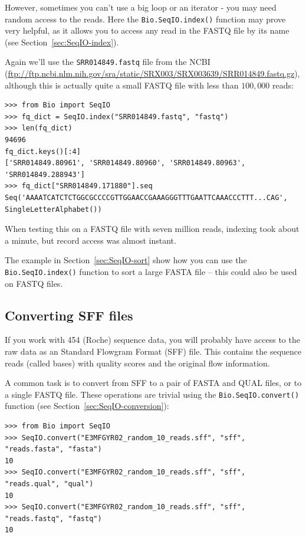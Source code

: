 \documentclass{report}
\begin{document}
However, sometimes you can't use a big loop or an iterator - you may need
random access to the reads. Here the \verb|Bio.SeqIO.index()| function
may prove very helpful, as it allows you to access any read in the FASTQ file
by its name (see Section~\ref{sec:SeqIO-index}).

Again we'll use the \texttt{SRR014849.fastq} file from the NCBI
(\url{ftp://ftp.ncbi.nlm.nih.gov/sra/static/SRX003/SRX003639/SRR014849.fastq.gz}),
although this is actually quite a small FASTQ file with less than $100,000$ reads:

\begin{verbatim}
>>> from Bio import SeqIO
>>> fq_dict = SeqIO.index("SRR014849.fastq", "fastq")
>>> len(fq_dict)
94696
fq_dict.keys()[:4]
['SRR014849.80961', 'SRR014849.80960', 'SRR014849.80963', 'SRR014849.288943']
>>> fq_dict["SRR014849.171880"].seq
Seq('AAAATCATCTCTGGCGCCCCGTTGGAACCGAAAGGGTTTGAATTCAAACCCTTT...CAG', SingleLetterAlphabet())
\end{verbatim}

When testing this on a FASTQ file with seven million reads,
indexing took about a minute, but record access was almost instant.

The example in Section~\ref{sec:SeqIO-sort} show how you can use the
\verb|Bio.SeqIO.index()| function to sort a large FASTA file -- this
could also be used on FASTQ files.

\subsection{Converting SFF files}
\label{sec:SeqIO-sff-conversion}

If you work with 454 (Roche) sequence data, you will probably have access
to the raw data as an Standard Flowgram Format (SFF) file. This contains
the sequence reads (called bases) with quality scores and the original
flow information.

A common task is to convert from SFF to a pair of FASTA and QUAL files,
or to a single FASTQ file. These operations are trivial using the
\verb|Bio.SeqIO.convert()| function (see Section~\ref{sec:SeqIO-conversion}):

\begin{verbatim}
>>> from Bio import SeqIO
>>> SeqIO.convert("E3MFGYR02_random_10_reads.sff", "sff", "reads.fasta", "fasta")
10
>>> SeqIO.convert("E3MFGYR02_random_10_reads.sff", "sff", "reads.qual", "qual")
10
>>> SeqIO.convert("E3MFGYR02_random_10_reads.sff", "sff", "reads.fastq", "fastq")
10
\end{verbatim}
\end{document}
